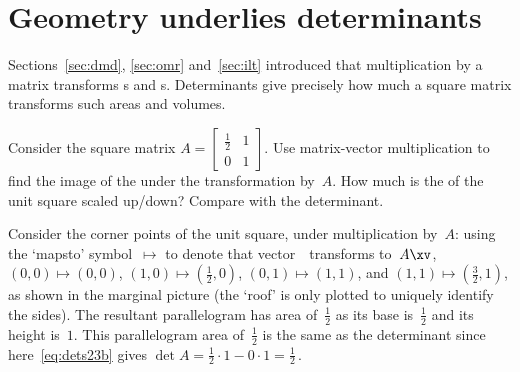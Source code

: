 
\section{Geometry underlies determinants}
\label{sec:gud}
\secttoc



\begin{comment}
Develop {determinant}s from a geometric basis to most quickly get critical results.
This geometric approach ``encourages students to engage in what Blum and Kirsch call preformal proving'' \cite[p.401]{Hannah96}.
\end{comment}

Sections~\ref{sec:dmd}, \ref{sec:omr} and~\ref{sec:ilt} introduced that multiplication by a matrix transforms s and s.
Determinants give precisely how much a square matrix transforms such areas and volumes.

\begin{example} \label{eg:detarea1}
Consider the square matrix \(A=\begin{bmatrix} \tfrac12&1\\0&1 \end{bmatrix}\).
Use matrix-vector multiplication to find the image of the  under the transformation by~\(A\).
How much is the  of the unit square scaled up/down?  
Compare with the determinant.
\begin{solution} 
Consider the corner points of the unit square, under multiplication by~\(A\): 
%
using the `{mapsto}' symbol~\index{$\mapsto$}$\mapsto$ to denote that vector~\xv\ transforms to~\(A\xv\), \((0,0)\mapsto(0,0)\), \((1,0)\mapsto(\frac12,0)\), \((0,1)\mapsto(1,1)\), and \((1,1)\mapsto(\frac32,1)\), as shown in the marginal picture 
(the `roof' is only plotted to uniquely identify the sides).
The resultant parallelogram has area of~\(\frac12\) as its base is~\(\frac12\) and its height is~\(1\).
This parallelogram area of~\(\tfrac12\) is the same as the determinant since here~\eqref{eq:dets23b} gives \(\det A=\frac12\cdot1-0\cdot1=\frac12\)\,. 
\end{solution}
\end{example}


